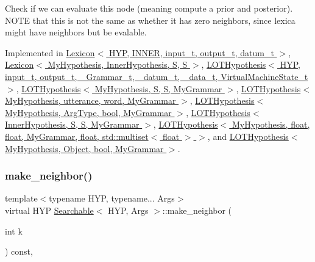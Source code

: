 Check if we can evaluate this node (meaning compute a prior and posterior). N\+O\+TE that this is not the same as whether it has zero neighbors, since lexica might have neighbors but be evalable. 



Implemented in \hyperlink{class_lexicon_ab9fcefbd8598a5401a39bd59e8043db9}{Lexicon$<$ H\+Y\+P, I\+N\+N\+E\+R, input\+\_\+t, output\+\_\+t, datum\+\_\+t $>$}, \hyperlink{class_lexicon_ab9fcefbd8598a5401a39bd59e8043db9}{Lexicon$<$ My\+Hypothesis, Inner\+Hypothesis, S, S $>$}, \hyperlink{class_l_o_t_hypothesis_a9eeaaf321324d2418405f4d7252f6ca4}{L\+O\+T\+Hypothesis$<$ H\+Y\+P, input\+\_\+t, output\+\_\+t, \+\_\+\+Grammar\+\_\+t, \+\_\+datum\+\_\+t, \+\_\+data\+\_\+t, Virtual\+Machine\+State\+\_\+t $>$}, \hyperlink{class_l_o_t_hypothesis_a9eeaaf321324d2418405f4d7252f6ca4}{L\+O\+T\+Hypothesis$<$ My\+Hypothesis, S, S, My\+Grammar $>$}, \hyperlink{class_l_o_t_hypothesis_a9eeaaf321324d2418405f4d7252f6ca4}{L\+O\+T\+Hypothesis$<$ My\+Hypothesis, utterance, word, My\+Grammar $>$}, \hyperlink{class_l_o_t_hypothesis_a9eeaaf321324d2418405f4d7252f6ca4}{L\+O\+T\+Hypothesis$<$ My\+Hypothesis, Arg\+Type, bool, My\+Grammar $>$}, \hyperlink{class_l_o_t_hypothesis_a9eeaaf321324d2418405f4d7252f6ca4}{L\+O\+T\+Hypothesis$<$ Inner\+Hypothesis, S, S, My\+Grammar $>$}, \hyperlink{class_l_o_t_hypothesis_a9eeaaf321324d2418405f4d7252f6ca4}{L\+O\+T\+Hypothesis$<$ My\+Hypothesis, float, float, My\+Grammar, float, std\+::multiset$<$ float $>$ $>$}, and \hyperlink{class_l_o_t_hypothesis_a9eeaaf321324d2418405f4d7252f6ca4}{L\+O\+T\+Hypothesis$<$ My\+Hypothesis, Object, bool, My\+Grammar $>$}.

\mbox{\label{class_searchable_acd4cf198859084f7a656ef507e65a872}} 
\subsubsection{\texorpdfstring{make\+\_\+neighbor()}{make\_neighbor()}}
{\footnotesize\ttfamily template$<$typename H\+YP, typename... Args$>$ \\
virtual H\+YP \hyperlink{class_searchable}{Searchable}$<$ H\+YP, Args $>$\+::make\+\_\+neighbor (\begin{DoxyParamCaption}\item[{int}]{k }\end{DoxyParamCaption}) const\hspace{0.3cm}{\ttfamily [inline]}, {\ttfamily [virtual]}}



